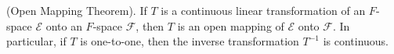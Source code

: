 (Open Mapping Theorem). If $T$ is a continuous linear transformation of an $F$-space $\mathcal{E}$ onto an $F$-space $\mathcal{F}$, then $T$ is an open mapping of $\mathcal{E}$ onto $\mathcal{F}$. In particular, if $T$ is one-to-one, then the inverse transformation $T^{-1}$ is continuous.
